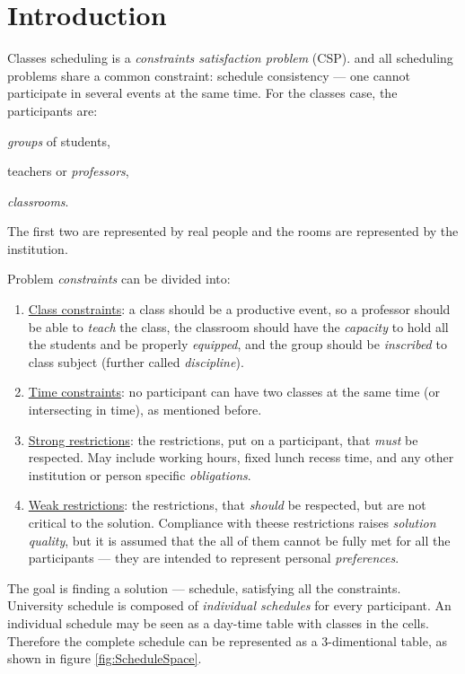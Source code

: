 
\section{Introduction}

Classes scheduling is a \emph{constraints satisfaction problem} (CSP).
and all scheduling problems share a common constraint: schedule consistency ---
one cannot participate in several events at the same time. For the classes case,
the participants are:
\begin{enumerate*}[1)]
  \item \emph{groups} of students,
  \item teachers or \emph{professors},
  \item \emph{classrooms}.
\end{enumerate*}
The first two are represented by real people and the rooms are represented by
the institution.

Problem \emph{constraints} can be divided into:
\begin{enumerate}
  \item \underline{Class constraints}: a class should be a productive event, so
    a professor should be able to \emph{teach} the class, the classroom should
    have the \emph{capacity} to hold all the students and be properly \emph{equipped},
    and the group should be \emph{inscribed} to class subject
    (further called \emph{discipline}).
  \item \underline{Time constraints}: no participant can have two classes
    at the same time (or intersecting in time), as mentioned before.
  \item \underline{Strong restrictions}: the restrictions, put on a participant, that
    \emph{must} be respected. May include working hours, fixed lunch recess time,
    and any other institution or person specific \emph{obligations}.
  \item \underline{Weak restrictions}: the restrictions, that \emph{should} be respected,
    but are not critical to the solution. Compliance with theese restrictions
    raises \emph{solution quality}, but it is assumed that the all of them
    cannot be fully met for all the participants --- they are intended to
    represent personal \emph{preferences}.
\end{enumerate}

The goal is finding a solution --- schedule, satisfying all the constraints.
University schedule is composed of \emph{individual schedules} for every
participant. An individual schedule may be seen as a day-time table with
classes in the cells. Therefore the complete schedule can be represented as a
3-dimentional table, as shown in figure \ref{fig:ScheduleSpace}.
\bigskip

